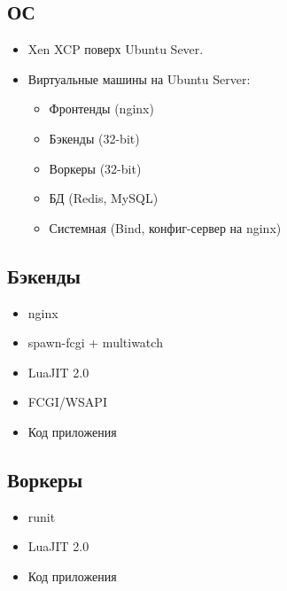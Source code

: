 \documentclass[aspectratio=169,handout,bigger]{beamer}
\begin{document}

\subsection*{ОС}

\begin{frame}
  \begin{itemize}
    \item Xen XCP поверх Ubuntu Sever.
    \item Виртуальные машины на Ubuntu Server:
    \begin{itemize}
      \item Фронтенды (nginx)
      \item Бэкенды (32-bit)
      \item Воркеры (32-bit)
      \item БД (Redis, MySQL)
      \item Системная (Bind, конфиг-сервер на nginx)
    \end{itemize}
  \end{itemize}
\end{frame}


\subsection*{Бэкенды}

\begin{frame}
  \begin{itemize}
    \item nginx
    \item spawn-fcgi + multiwatch
    \item LuaJIT 2.0
    \item FCGI/WSAPI
    \item Код приложения
  \end{itemize}
\end{frame}


\subsection*{Воркеры}

\begin{frame}
  \begin{itemize}
    \item runit
    \item LuaJIT 2.0
    \item Код приложения
  \end{itemize}
\end{frame}
\end{document}
